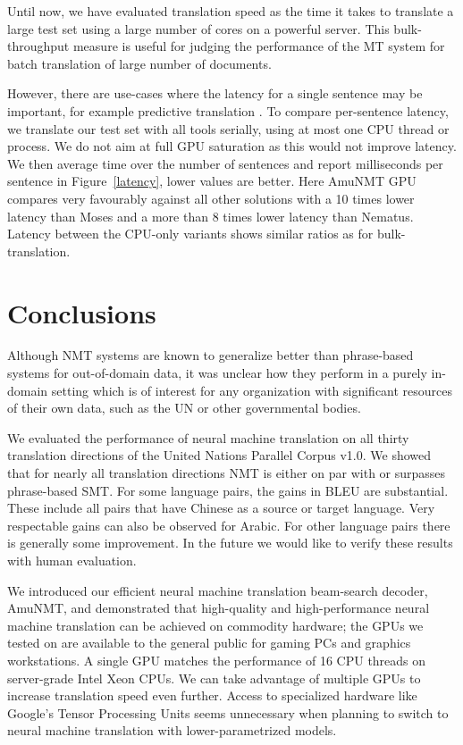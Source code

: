 \documentclass[11pt]{article}
\begin{document}
Until now, we have evaluated translation speed as the time it takes to translate a large test set using a large number of cores on a powerful server. This bulk-throughput measure is useful for judging the performance of the MT system for batch translation of large number of documents.
 
However, there are use-cases where the latency for a single sentence may be important, for example predictive translation \cite{Knowles}. 
To compare per-sentence latency, we translate our test set with all tools serially, using at most one CPU thread or process. We do not aim at full GPU saturation as this would not improve latency. We then average time over the number of sentences and report milliseconds per sentence in Figure~\ref{latency}, lower values are better. Here AmuNMT GPU compares very favourably against all other solutions with a 10 times lower latency than Moses and a more than 8 times lower latency than Nematus. Latency between the CPU-only variants shows similar ratios as for bulk-translation. 

\section{Conclusions}

Although NMT systems are known to generalize better than phrase-based systems for out-of-domain data, it was unclear how they perform in a purely in-domain setting which is of interest for any organization with significant resources of their own data, such as the UN or other governmental bodies.

We evaluated the performance of neural machine translation on all thirty translation directions of the United Nations Parallel Corpus v1.0. We showed that for nearly all translation directions NMT is either on par with or surpasses phrase-based SMT. For some language pairs, the gains in BLEU are substantial. These include all pairs that have Chinese as a source or target language. Very respectable gains can also be observed for Arabic. For other language pairs there is generally some improvement.  In the future we would like to verify these results with human evaluation.

We introduced our efficient neural machine translation beam-search decoder, AmuNMT, and demonstrated that high-quality and high-performance neural machine translation can be achieved on commodity hardware; the GPUs we tested on are available to the general public for gaming PCs and graphics workstations. A single GPU matches the performance of 16 CPU threads on server-grade Intel Xeon CPUs. We can take advantage of multiple GPUs to increase translation speed even further. Access to specialized hardware like Google's Tensor Processing Units seems unnecessary when planning to switch to neural machine translation with lower-parametrized models. 
\end{document}
